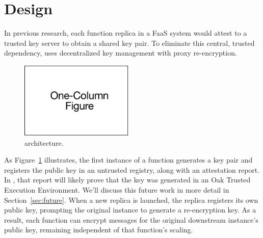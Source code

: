 \section{Design}
\label{sec:design}


%
In previous research, each function replica in a FaaS system would attest to a trusted key
server to obtain a shared key pair.
%
To eliminate this central, trusted dependency, \SystemName
uses decentralized key management with proxy re-encryption.
%
\begin{figure}
    \centering
    \includegraphics[page = 4, width=0.48\textwidth]{diagrams/slides.pdf}
    \caption{\SystemName architecture.}
    \label{fig:arch}
\end{figure}
%
As Figure~\ref{fig:arch} illustrates, the first instance of a function
generates a key pair and registers the public key in an untrusted registry,
along with an attestation report.
%
In \SystemName, that report will likely prove that the key was generated in an Oak
Trusted Execution Environment\@.
%
We'll discuss this future work in more detail in Section~\ref{sec:future}.
%
When a new replica is launched, the replica registers its own public key,
prompting the original instance to generate a re-encryption key.
%
%
As a result, each function can encrypt messages for the original downstream
instance's public key, remaining independent of that function's scaling.



